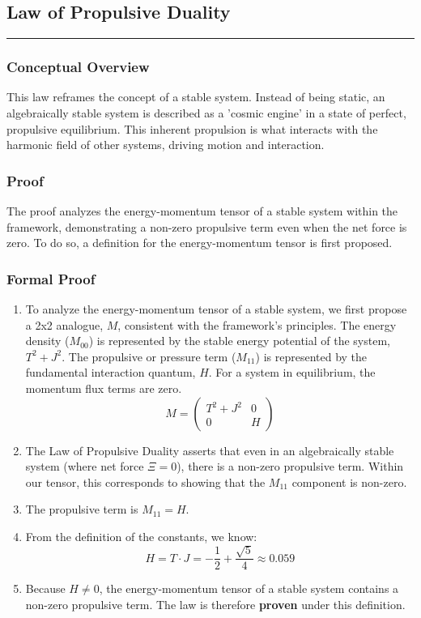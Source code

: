 \subsection*{Law of Propulsive Duality}
\hrule
\vspace{0.3cm}
\vspace{0.5cm}

\subsubsection*{Conceptual Overview}
This law reframes the concept of a stable system. Instead of being static, an algebraically stable system is described as a 'cosmic engine' in a state of perfect, propulsive equilibrium. This inherent propulsion is what interacts with the harmonic field of other systems, driving motion and interaction.

\subsubsection*{Proof}
The proof analyzes the energy-momentum tensor of a stable system within the framework, demonstrating a non-zero propulsive term even when the net force is zero. To do so, a definition for the energy-momentum tensor is first proposed.

\subsubsection*{Formal Proof}
\begin{enumerate}
    \item To analyze the energy-momentum tensor of a stable system, we first propose a 2x2 analogue, $M$, consistent with the framework's principles. The energy density ($M_{00}$) is represented by the stable energy potential of the system, $T^2+J^2$. The propulsive or pressure term ($M_{11}$) is represented by the fundamental interaction quantum, $H$. For a system in equilibrium, the momentum flux terms are zero.
    $$ M = \begin{pmatrix} T^2+J^2 & 0 \\ 0 & H \end{pmatrix} $$
    
    \item The Law of Propulsive Duality asserts that even in an algebraically stable system (where net force $\Xi=0$), there is a non-zero propulsive term. Within our tensor, this corresponds to showing that the $M_{11}$ component is non-zero.
    
    \item The propulsive term is $M_{11} = H$.
    
    \item From the definition of the constants, we know:
    $$ H = T \cdot J = -\frac{1}{2} + \frac{\sqrt{5}}{4} \approx 0.059 $$
    
    \item Because $H \neq 0$, the energy-momentum tensor of a stable system contains a non-zero propulsive term. The law is therefore \textbf{proven} under this definition.
\end{enumerate}

